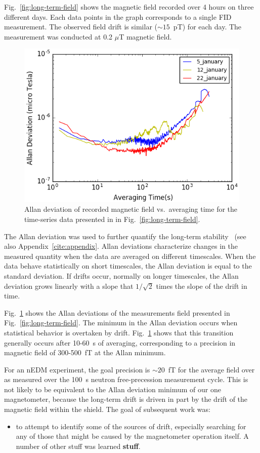 Fig.~\ref{fig:long-term-field} shows the magnetic field recorded over
4 hours on three different days. Each data points in the graph
corresponds to a single FID measurement.  The observed field drift is
similar ($\sim 15$~pT) for each day.  The measurement was conducted at
0.2 $\mu$T magnetic field.

\begin{figure}%
\centering\includegraphics[width=0.8\linewidth]{figures/field_3_day_allan.png}
\caption{Allan deviation of recorded magnetic field vs.~averaging time
  for the time-series data presented in in
  Fig.~\ref{fig:long-term-field}.\label{fig:allan_deviation}}
\end{figure}

The Allan deviation was used to further quantify the long-term
stability~\cite{doe:website2} (see also Appendix~\ref{cite:appendix}.
Allan deviations characterize changes in the measured quantity when
the data are averaged on different timescales.  When the data behave
statistically on short timescales, the Allan deviation is equal to the
standard deviation.  If drifts occur, normally on longer timescales,
the Allan deviation grows linearly with a slope that $1/\sqrt{2}$
times the slope of the drift in time.

Fig.~\ref{fig:allan_deviation} shows the Allan deviations of the
measurements field presented in Fig.~\ref{fig:long-term-field}.  The
minimum in the Allan deviation occurs when statistical behavior is
overtaken by drift.  Fig.~\ref{fig:allan_deviation} shows that this
transition generally occurs after 10-60~s of averaging, corresponding
to a precision in magnetic field of 300-500~fT at the Allan minimum.

For an nEDM experiment, the goal precision is $\sim 20$~fT for the
average field over as measured over the 100~s neutron free-precession
measurement cycle.  This is not likely to be equivalent to the Allan
deviation minimum of our one magnetometer, because the long-term drift
is driven in part by the drift of the magnetic field within the
shield.  The goal of subsequent work was:
\begin{itemize}
\item to attempt to identify some of the sources of drift, especially
  searching for any of those that might be caused by the magnetometer
  operation itself.  A number of other stuff was learned {\bf stuff}.
\end{itemize}

